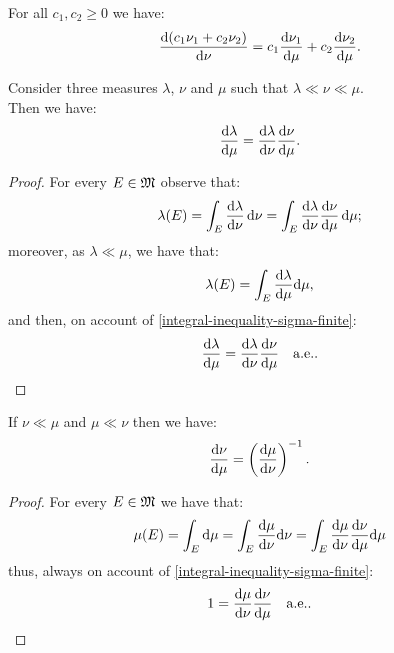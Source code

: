 \begin{prop}
	For all $c_1, c_2 \geq 0$ we have:
	$$\dfrac{\mathrm d(c_1\nu_1+c_2\nu_2)}{\mathrm d\nu} = c_1 \dfrac{\mathrm d\nu_1}{\mathrm d\mu}+ c_2 \dfrac{\mathrm d\nu_2}{\mathrm d\mu}.$$
\end{prop}

\begin{prop}
	Consider three measures $\lambda$, $\nu$ and $\mu$ such that $\lambda \ll \nu \ll \mu$.\\
	Then we have:
	$$\dfrac{\mathrm d \lambda}{\mathrm d\mu} =
	\dfrac {\mathrm d \lambda}{\mathrm d\nu} \dfrac{\mathrm d\nu}{\mathrm d\mu}.$$
\end{prop}
\begin{proof}
	For every $E \in \mathfrak M$ observe that:
	$$
		\lambda(E)
		= \int_E\frac{\mathrm d \lambda}{\mathrm d\nu} \,\mathrm d\nu
		= \int_E \frac{\mathrm d \lambda}{\mathrm d\nu}\frac{\mathrm d\nu}{\mathrm d\mu} \,\mathrm d \mu
	;
	$$
	moreover, as $\lambda \ll \mu$, we have that:
	$$
		\lambda(E)
		= \int_E \frac{\mathrm d \lambda}{\mathrm d\mu} \mathrm d\mu
	,
	$$
	and then, on account of \vref{integral-inequality-sigma-finite}:
	$$
		\frac{\mathrm d \lambda}{\mathrm d\mu}
		= \frac{\mathrm d \lambda}{\mathrm d\nu}\frac{\mathrm d\nu}{\mathrm d\mu}
		\quad \text{a.e.}
	.
	$$
\end{proof}

\begin{prop}
	If $\nu \ll \mu$ and $\mu \ll \nu$ then we have:
	$$\dfrac {\mathrm d\nu}{\mathrm d\mu} =
	\left(\dfrac{\mathrm d\mu}{\mathrm d\nu}\right)^{-1}.$$
\end{prop}
\begin{proof}
	For every $E \in \mathfrak M$ we have that:
	$$\mu(E) =\int_E \mathrm d\mu 
	= \int_E \frac{\mathrm d\mu}{\mathrm d\nu}\mathrm d\nu
	= \int_E \frac{\mathrm d\mu}{\mathrm d\nu}\frac{\mathrm d\nu}{\mathrm d\mu}\mathrm d\mu$$
	thus, always on account of \vref{integral-inequality-sigma-finite}:
	$$1 =
	\frac{\mathrm d\mu}{\mathrm d\nu}\frac{\mathrm d\nu}{\mathrm d\mu}
	\quad \text{a.e.}.$$
\end{proof}